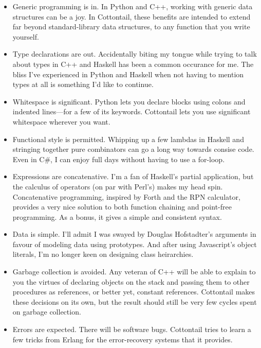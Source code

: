 \begin{itemize}

\item Generic programming is in. In Python and C++, working with
generic data structures can be a joy. In Cottontail, these benefits
are intended to extend far beyond standard-library data structures,
to any function that you write yourself.

\item Type declarations are out. Accidentally biting my tongue while
trying to talk about types in C++ and Haskell has been a common
occurance for me. The bliss I've experienced in Python and Haskell
when not having to mention types at all is something I'd like to
continue.

\item Whitespace is significant. Python lets you declare blocks using
colons and indented lines---for a few of its keywords. Cottontail lets
you use significant whitespace wherever you want.

\item Functional style is permitted. Whipping up a few lambdas in
Haskell and stringing together pure combinators can go a long way
towards consise code. Even in C\#, I can enjoy full days without
having to use a for-loop.

\item Expressions are concatenative. I'm a fan of Haskell's partial
application, but the calculus of operators (on par with Perl's) makes
my head spin. Concatenative programming, inspired by Forth and the RPN
calculator, provides a very nice solution to both function chaining
and point-free programming. As a bonus, it gives a simple and
consistent syntax.

\item Data is simple. I'll admit I was swayed by Douglas Hofstadter's
arguments in favour of modeling data using prototypes. And after using
Javascript's object literals, I'm no longer keen on designing class
heirarchies.

\item Garbage collection is avoided. Any veteran of C++ will be able
to explain to you the virtues of declaring objects on the stack and
passing them to other procedures as references, or better yet,
constant references. Cottontail makes these decisions on its own, but
the result should still be very few cycles spent on garbage
collection.

\item Errors are expected. There will be software bugs. Cottontail
tries to learn a few tricks from Erlang for the error-recovery
systems that it provides.


\end{itemize}
